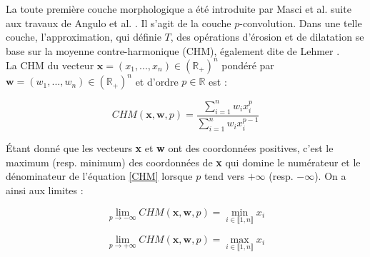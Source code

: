La toute première couche morphologique a été introduite par Masci et al. \cite{Masci_2012} suite aux travaux de Angulo et al. \cite{Angulo_2010}. Il s'agit de la couche $p$-convolution. Dans une telle couche, l'approximation, qui définie $T$, des opérations d'érosion et de dilatation se base sur la moyenne contre-harmonique (CHM), également dite de Lehmer \cite{Bullen_1987}. \\

\vspace{-1.8mm}
\noindent La CHM du vecteur $\textbf{x} = (x_1,...,x_n) \in (\mathbb{R}_+)^n$ pondéré par $\textbf{w} = (w_1,...,w_n) \in (\mathbb{R}_+)^n$ et d'ordre $p \in \mathbb{R}$ est : %

\vspace{-5mm}
\begin{equation}
    CHM(\textbf{x},\textbf{w},p) = \frac{\sum_{i=1}^n w_ix_i^p}{\sum_{i=1}^n w_ix_i^{p-1}}
    \label{CHM}
\end{equation}

\vspace{2mm}
\noindent Étant donné que les vecteurs \textbf{x} et \textbf{w} ont des coordonnées positives, c'est le maximum (resp. minimum) des coordonnées de \textbf{x} qui domine le numérateur et le dénominateur de l'équation \ref{CHM} lorsque $p$ tend vers $+\infty$ (resp. $-\infty$). On a ainsi aux limites : %

\vspace{2.6mm}
\noindent\begin{minipage}{.5\linewidth}
    \begin{equation*} 
        \lim_{p \rightarrow -\infty} CHM(\textbf{x},\textbf{w},p) = \min_{i \in \llbracket 1,n \rrbracket} x_i 
    \end{equation*}
\end{minipage}%
\begin{minipage}{.5\linewidth}
    \begin{equation*} 
        \lim_{p \rightarrow +\infty} CHM(\textbf{x},\textbf{w},p) = \max_{i \in \llbracket 1,n \rrbracket} x_i 
    \end{equation*}
\end{minipage}

